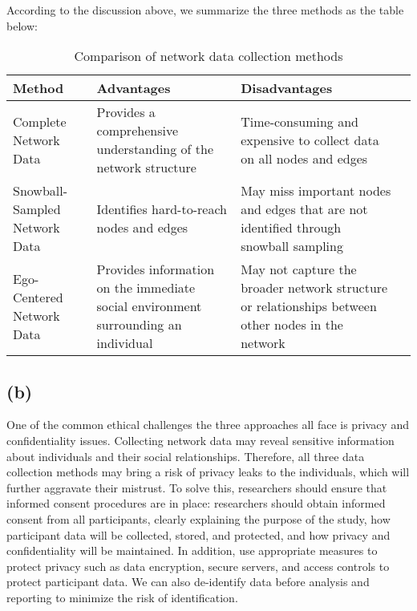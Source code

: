 \documentclass[11pt]{article}
\begin{document}
    \par According to the discussion above, we summarize the three methods as the table below:
        \begin{table}[ht]
        \centering
        \caption{Comparison of network data collection methods}
        \label{tab:network-data}
        \begin{tabular}{|l|p{4.5cm}|p{4.5cm}|p{4.5cm}|}
        \hline
        Method & Advantages & Disadvantages \\
        \hline
        Complete Network Data &  Provides a comprehensive understanding of the network structure & Time-consuming and expensive to collect data on all nodes and edges \\
        \hline
        Snowball-Sampled Network Data  & Identifies hard-to-reach nodes and edges & May miss important nodes and edges that are not identified through snowball sampling \\
        \hline
        Ego-Centered Network Data & Provides information on the immediate social environment surrounding an individual & May not capture the broader network structure or relationships between other nodes in the network \\
        \hline
        \end{tabular}
        \end{table}  
        
\subsection*{(b)}
    \par One of the common  ethical challenges the three approaches all face is privacy and confidentiality issues. Collecting network data may reveal sensitive information about individuals and their social relationships. Therefore, all three data collection methods may bring a risk of privacy leaks to the individuals, which will further aggravate their mistrust. To solve this, researchers should ensure that informed consent procedures are in place: researchers should obtain informed consent from all participants, clearly explaining the purpose of the study, how participant data will be collected, stored, and protected, and how privacy and confidentiality will be maintained. In addition, use appropriate measures to protect privacy such as data encryption, secure servers, and access controls to protect participant data. We can also de-identify data before analysis and reporting to minimize the risk of identification.
    
\end{document}

